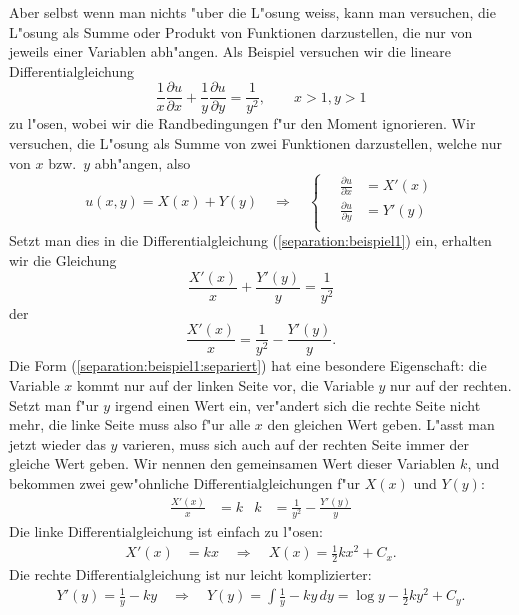 Aber selbst wenn man nichts "uber die L"osung weiss, kann man 
versuchen, die L"osung als Summe oder Produkt von Funktionen darzustellen,
die nur von jeweils einer Variablen abh"angen. Als Beispiel versuchen
wir die lineare Differentialgleichung 
\begin{equation}
\frac1x
\frac{\partial u}{\partial x}
+
\frac1y
\frac{\partial u}{\partial y}
=\frac1{y^2}
,
\qquad x>1, y>1
\label{separation:beispiel1}
\end{equation}
zu l"osen, wobei wir die Randbedingungen f"ur den Moment ignorieren.
Wir versuchen, die L"osung als Summe von zwei Funktionen darzustellen,
welche nur von $x$ bzw.~$y$ abh"angen, also
\begin{equation}
u(x,y)=X(x)+Y(y)
\quad\Rightarrow\quad
\begin{cases}
\quad\frac{\partial u}{\partial x}&=X'(x)\\
\quad\frac{\partial u}{\partial y}&=Y'(y)\\
\end{cases}
\label{separation:beispiel1:ansatz}
\end{equation}
Setzt man dies in die Differentialgleichung (\ref{separation:beispiel1})
ein, erhalten wir die Gleichung
\[
\frac{X'(x)}{x}+\frac{Y'(y)}{y}=\frac1{y^2}
\]
der
\begin{equation}
\frac{X'(x)}{x}
=\frac1{y^2}
-\frac{Y'(y)}{y}.
\label{separation:beispiel1:separiert}
\end{equation}
Die Form (\ref{separation:beispiel1:separiert}) hat eine besondere
Eigenschaft: die Variable $x$ kommt nur auf der linken Seite vor,
die Variable $y$ nur auf der rechten. Setzt man f"ur $y$ irgend
einen Wert ein, ver"andert sich die rechte Seite nicht mehr,
die linke Seite muss also f"ur alle $x$ den gleichen Wert geben.
L"asst man jetzt wieder das $y$ varieren, muss sich auch auf der rechten
Seite immer der gleiche Wert geben. Wir nennen den gemeinsamen Wert
dieser Variablen $k$, und bekommen zwei gew"ohnliche Differentialgleichungen
f"ur $X(x)$ und $Y(y)$:
\begin{align}
\frac{X'(x)}{x}&=k
&
k&=\frac1{y^2}-\frac{Y'(y)}{y}
\label{separation:beispiel1:separiertedgl}
\end{align}
Die linke Differentialgleichung ist einfach zu l"osen:
\begin{align*}
X'(x)&=kx\quad\Rightarrow\quad X(x)=
\frac12kx^2+C_x.
\end{align*}
Die rechte Differentialgleichung ist nur leicht komplizierter:
\begin{align*}
Y'(y)=\frac1y-ky
\quad\Rightarrow\quad
Y(y)=\int\frac1y-ky\,dy=
\log y-\frac12ky^2+C_y.
\end{align*}
